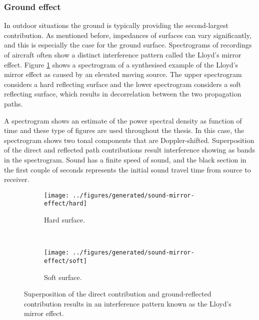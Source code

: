 
\subsubsection*{Ground effect}
In outdoor situations the ground is typically providing the second-largest
contribution. As mentioned
before, impedances of surfaces can vary significantly, and this is especially
the case for the ground surface. Spectrograms of recordings of aircraft often
show a distinct interference pattern called the Lloyd's mirror effect.
Figure \ref{fig:theory:sound:reflection:ground} shows a spectrogram of a
synthesised example of the Lloyd's mirror effect as caused by an elevated moving
source. The upper spectrogram considers a hard reflecting surface and the lower
spectrogram considers a soft reflecting surface, which results in decorrelation
between the two propagation paths.

A spectrogram shows an estimate of the power spectral density as function of
time and these type of figures are used throughout the thesis. In this case, the
spectrogram shows two tonal components that are Doppler-shifted. Superposition
of the direct and reflected path contributions result interference showing as
bands in the spectrogram. Sound has a finite speed of sound, and the black
section in the first couple of seconds represents the initial sound travel time
from source to receiver.

\begin{figure}
    \begin{subfigure}{\textwidth}
        \texttt{[image: ../figures/generated/sound-mirror-effect/hard]}
        \caption{Hard surface.}
    \end{subfigure}
    ~
    \begin{subfigure}{\textwidth}
        \texttt{[image: ../figures/generated/sound-mirror-effect/soft]}
        \caption{Soft surface.}
    \end{subfigure}
    \caption{Superposition of the direct contribution and ground-reflected contribution results in an interference pattern known as the Lloyd's mirror effect.}
    \label{fig:theory:sound:reflection:ground}
\end{figure}

